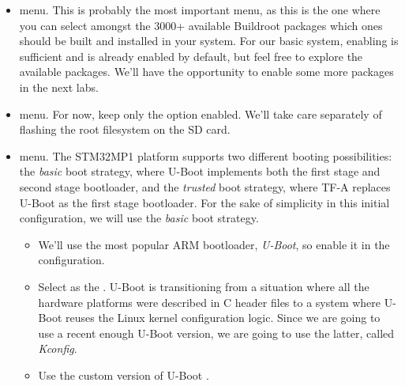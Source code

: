 \begin{itemize}
\begin{itemize}
  \item The kernel configuration for this platform requires having
    OpenSSL available on the host machine. To avoid depending on the
    OpenSSL development files installed by your host machine Linux
    distribution, Buildroot can build its own version: just enable the
     option.

  \end{itemize}

\item {} menu. This is probably the most important
  menu, as this is the one where you can select amongst the 3000+
  available Buildroot packages which ones should be built and
  installed in your system. For our basic system, enabling
   is sufficient and is already enabled by default, but
  feel free to explore the available packages. We'll have the
  opportunity to enable some more packages in the next labs.

\item {} menu. For now, keep only the  option enabled. We'll take care separately of
  flashing the root filesystem on the SD card.

\item {} menu. The STM32MP1 platform supports two
  different booting possibilities: the {\em basic} boot strategy,
  where U-Boot implements both the first stage and second stage
  bootloader, and the {\em trusted} boot strategy, where TF-A replaces
  U-Boot as the first stage bootloader. For the sake of simplicity in
  this initial configuration, we will use the {\em basic} boot
  strategy.

  \begin{itemize}

  \item We'll use the most popular ARM bootloader, {\em U-Boot}, so
    enable it in the configuration.

  \item Select  as the . U-Boot is
    transitioning from a situation where all the hardware platforms
    were described in C header files to a system where U-Boot reuses
    the Linux kernel configuration logic. Since we are going to use a
    recent enough U-Boot version, we are going to use the latter,
    called {\em Kconfig}.

  \item Use the custom version of U-Boot .


\end{itemize}
\end{itemize}
